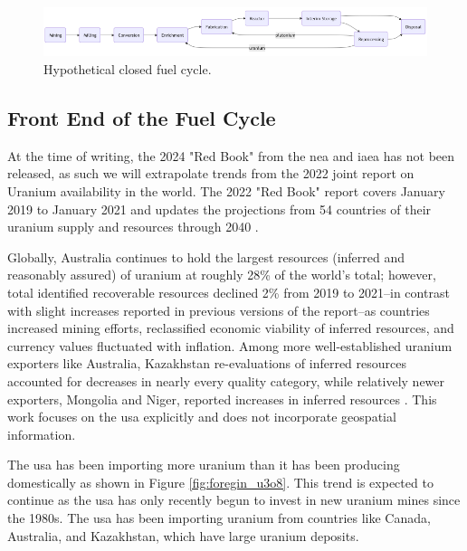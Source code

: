 \begin{figure}[H]
      \centering
      \includegraphics[scale=0.55]{images/nfc/closed_fc.png}
      \caption{Hypothetical closed fuel cycle.}
      \label{fig:closed_fc}
\end{figure}


\subsection{Front End of the Fuel Cycle}
\label{sec:front_end}
At the time of writing, the 2024 "Red Book" from the \gls{nea} and \gls{iaea}
has not been released, as such we will extrapolate trends from the 2022 joint
report on Uranium availability in the world. The 2022 "Red Book" report covers
January 2019 to January 2021 and updates the projections from 54 countries of
their uranium supply and resources through 2040 \cite{nea_red_book_2022}.

Globally, Australia continues to hold the largest resources (inferred and
reasonably assured) of uranium at roughly 28\% of the world's total; however,
total identified recoverable resources declined 2\% from 2019 to 2021--in
contrast with slight increases reported in previous versions of the report--as
countries increased mining efforts, reclassified economic viability of inferred
resources, and currency values fluctuated with inflation. Among more
well-established uranium exporters like Australia, Kazakhstan re-evaluations of
inferred resources accounted for decreases in nearly every quality category,
while relatively newer exporters, Mongolia and Niger, reported increases in
inferred resources \cite{nea_red_book_2022}. This work focuses on the \gls{usa}
explicitly and does not incorporate geospatial information.

The \gls{usa} has been importing more uranium than it has been producing
domestically as shown in Figure \ref{fig:foregin_u3o8}. This trend is expected
to continue as the \gls{usa} has only recently begun to invest in new uranium
mines since the 1980s. The \gls{usa} has been importing uranium from countries
like Canada, Australia, and Kazakhstan, which have large uranium deposits.


